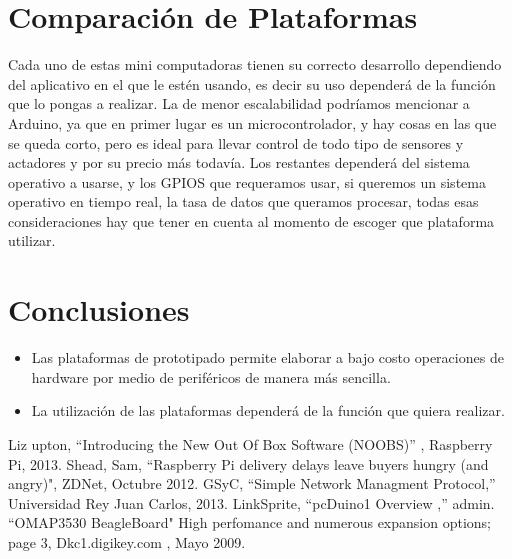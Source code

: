 \documentclass[conference]{IEEEtran}
\begin{document}
\section{Comparación de Plataformas}
Cada uno de estas mini computadoras tienen su correcto desarrollo dependiendo del aplicativo en el que le estén usando, es decir su uso dependerá de la función que lo pongas a realizar. La de menor escalabilidad podríamos mencionar a Arduino, ya que en primer lugar es un microcontrolador, y hay cosas en las que se queda corto, pero es ideal para llevar control de todo tipo de sensores y actadores y por su precio más todavía. Los restantes dependerá del sistema operativo a usarse, y los GPIOS que requeramos usar, si queremos un sistema operativo en tiempo real, la tasa de datos que queramos procesar, todas esas consideraciones hay que tener en cuenta al momento de escoger que plataforma utilizar.
\section{Conclusiones}
\begin{itemize}
	\item Las plataformas de prototipado permite elaborar a bajo costo operaciones de hardware por medio de periféricos de manera más sencilla.
	\item La utilización de las plataformas dependerá de la función que quiera realizar.
\end{itemize}
 
\begin{thebibliography}{00}
  Liz upton, ``Introducing the New Out Of Box Software (NOOBS)'' , Raspberry Pi, 2013.
 Shead, Sam, ``Raspberry Pi delivery delays leave buyers hungry (and angry)", ZDNet, Octubre 2012.
 GSyC, ``Simple Network Managment Protocol,''  Universidad Rey Juan Carlos, 2013.
 LinkSprite, ``pcDuino1 Overview ,''  admin.
 ``OMAP3530 BeagleBoard" High perfomance and numerous expansion options; page 3, Dkc1.digikey.com , Mayo 2009.
\end{thebibliography}
\end{document}
